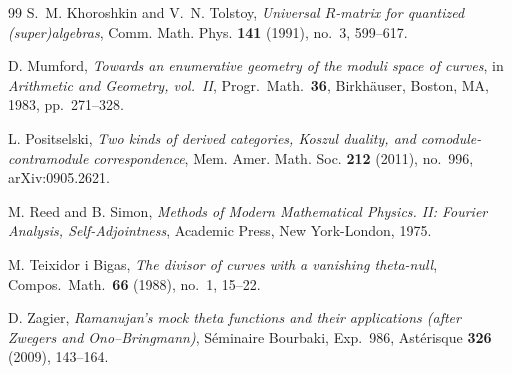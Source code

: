 \begin{thebibliography}{99}
S.~M. Khoroshkin and V.~N. Tolstoy, \emph{Universal $R$-matrix for quantized (super)algebras}, Comm. Math. Phys. \textbf{141} (1991), no.~3, 599--617.

D. Mumford, \emph{Towards an enumerative geometry of the moduli space of curves}, in \emph{Arithmetic and Geometry, vol.\ II}, Progr.\ Math.\ \textbf{36}, Birkh\"auser, Boston, MA, 1983, pp.~271--328. %

L. Positselski, \emph{Two kinds of derived categories, Koszul duality, and comodule-contramodule correspondence}, Mem. Amer. Math. Soc. \textbf{212} (2011), no.~996, arXiv:0905.2621.

M. Reed and B. Simon, \emph{Methods of Modern Mathematical Physics. II: Fourier Analysis, Self-Adjointness}, Academic Press, New York-London, 1975.

M. Teixidor i Bigas, \emph{The divisor of curves with a vanishing theta-null}, Compos.\ Math.\ \textbf{66} (1988), no.~1, 15--22. %

D. Zagier, \emph{Ramanujan's mock theta functions and their applications (after Zwegers and Ono--Bringmann)}, S\'eminaire Bourbaki, Exp.~986, Ast\'erisque \textbf{326} (2009), 143--164.

\end{thebibliography}
